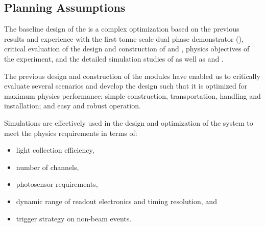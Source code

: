 



\subsection{Planning Assumptions}
\label{sec:fddp-pd-12.2}

The baseline design of the \dual {} is a complex optimization based on the previous results and experience with the first tonne scale dual phase   demonstrator (), critical evaluation of the design and construction of  and , physics objectives of the \dune experiment, and the detailed simulation studies of \dune {} as well as  and .

The previous design and construction of the \dual modules have enabled us to critically evaluate several scenarios and develop the \dune {} design such that it is optimized for maximum physics performance; simple construction, transportation, handling and installation; and easy and robust operation.

Simulations are effectively used in the design and optimization of the \dual {} system to meet the physics requirements in terms of:
\begin{itemize}
\item light collection efficiency,
\item number of channels,
\item photosensor requirements,
\item dynamic range of readout electronics and timing resolution, and 
\item trigger strategy on non-beam events.
\end{itemize}


